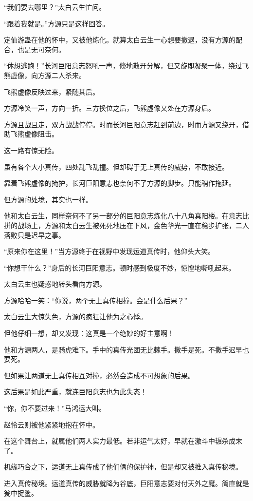 \begin{this_body}
“我们要去哪里？”太白云生忙问。

“跟着我就是。”方源只是这样回答。

定仙游蛊在他的怀中，又被他炼化。就算太白云生一心想要撤退，没有方源的配合，也是无可奈何。

“休想逃跑！”长河巨阳意志怒吼一声，倏地散开分解，但又旋即凝聚一体，绕过飞熊虚像，向方源二人杀来。

飞熊虚像反映过来，紧随其后。

方源冷笑一声，方向一折。三方换位之后，飞熊虚像又处在方源身后。

方源且战且走，双方战战停停。时而长河巨阳意志赶到前边，时而方源又绕开，借助飞熊虚像阻击。

这一路有惊无险。

虽有各个大小真传，四处乱飞乱撞。但却碍于无上真传的威势，不敢接近。

靠着飞熊虚像的掩护，长河巨阳意志也奈何不了方源的脚步。只能稍作拖延。

但方源的处境，其实也一样。

他和太白云生，同样奈何不了另一部分的巨阳意志炼化八十八角真阳楼。在意志比拼的战场上，方源和太白云生被死死地压在下风，金色华光一直在稳步扩张，二人落败只是迟早之事。

“原来你在这里！”当方源终于在视野中发现运道真传时，他仰头大笑。

“你想干什么？”身后的长河巨阳意志。顿时感到极度不妙，惊惶地嘶吼起来。

太白云生也疑惑地转头看向方源。

方源哈哈一笑：“你说，两个无上真传相撞。会是什么后果？”

太白云生大惊失色，方源的疯狂让他为之心悸。

但他仔细一想，却又发现：这真是一个绝妙的好主意啊！

他和方源两人，是骑虎难下。手中的真传光团无比棘手。撒手是死。不撒手迟早也要死。

但如果让两道无上真传相互对撞，必然会造成不可想象的后果。

这后果是如此严重，就连巨阳意志也为此失态！

“你，你不要过来！”马鸿运大叫。

赵怜云则被他紧紧地抱在怀中。

在这个舞台上，就属他们两人实力最低。若非运气太好，早就在激斗中辗杀成末了。

机缘巧合之下，运道无上真传成了他们俩的保护神，但是却又被推入真传秘境。

进入真传秘境。运道真传的威胁就降为谷底，巨阳意志要对付天外之魔。简直就是瓮中捉鳖。


\end{this_body}
